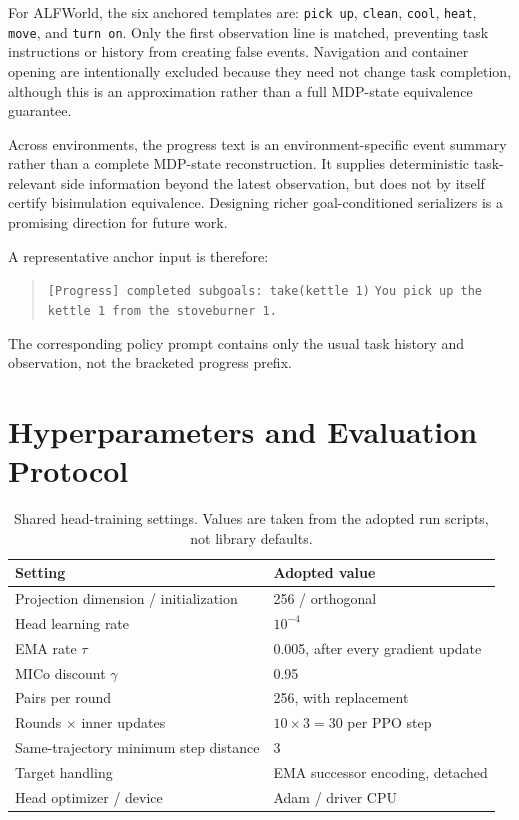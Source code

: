 For ALFWorld, the six anchored templates are:
\texttt{pick up}, \texttt{clean}, \texttt{cool}, \texttt{heat}, \texttt{move}, and \texttt{turn on}. Only the first observation line is matched, preventing task instructions or history from creating false events. Navigation and container opening are intentionally excluded because they need not change task completion, although this is an approximation rather than a full MDP-state equivalence guarantee.

Across environments, the progress text is an environment-specific event summary rather than a complete MDP-state reconstruction. It supplies deterministic task-relevant side information beyond the latest observation, but does not by itself certify bisimulation equivalence. Designing richer goal-conditioned serializers is a promising direction for future work.

A representative anchor input is therefore:
\begin{quote}\small
\texttt{[Progress] completed subgoals: take(kettle 1)}\newline
\texttt{You pick up the kettle 1 from the stoveburner 1.}
\end{quote}
The corresponding policy prompt contains only the usual task history and observation, not the bracketed progress prefix.

\section{Hyperparameters and Evaluation Protocol}
\label{app:hyperparams}

\begin{table}[h]
\centering
\caption{Shared head-training settings. Values are taken from the adopted run scripts, not library defaults.}
\label{tab:head_hparams}
\small
\begin{tabular}{@{}p{4.25cm}p{3.35cm}@{}}
\toprule
Setting & Adopted value \\
\midrule
Projection dimension / initialization & 256 / orthogonal \\
Head learning rate & $10^{-4}$ \\
EMA rate $\tau$ & 0.005, after every gradient update \\
MICo discount $\gamma$ & 0.95 \\
Pairs per round & 256, with replacement \\
Rounds $\times$ inner updates & $10\times3=30$ per PPO step \\
Same-trajectory minimum step distance & 3 \\
Target handling & EMA successor encoding, detached \\
Head optimizer / device & Adam / driver CPU \\
\bottomrule
\end{tabular}
\end{table}

